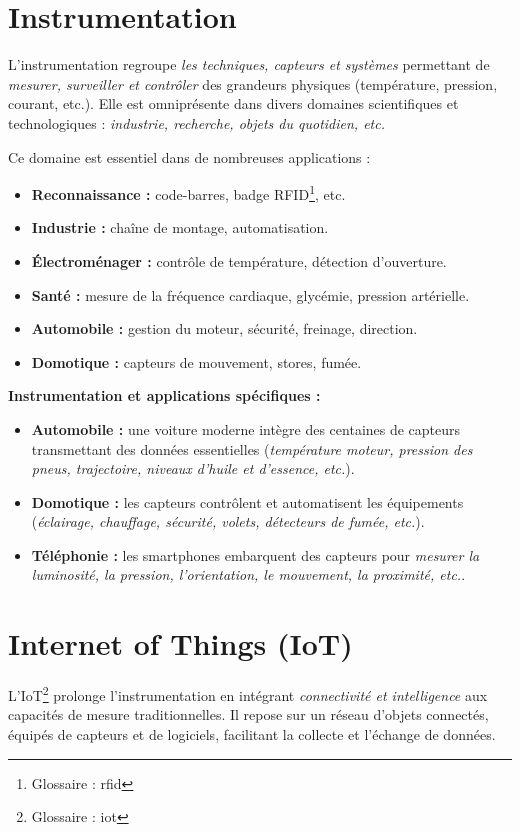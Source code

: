  \label{ch:Introduction}
\section{Instrumentation}
L'instrumentation regroupe \emph{les techniques, capteurs et systèmes} permettant de \emph{mesurer, surveiller et contrôler} des grandeurs physiques (température, pression, courant, etc.). Elle est omniprésente dans divers domaines scientifiques et technologiques : \emph{industrie, recherche, objets du quotidien, etc.}  

Ce domaine est essentiel dans de nombreuses applications :  
\begin{itemize}
  \item \textbf{Reconnaissance :} code-barres, badge RFID\footnote{Glossaire : \gls{rfid}}, etc.  
  \item \textbf{Industrie :} chaîne de montage, automatisation.  
  \item \textbf{Électroménager :} contrôle de température, détection d'ouverture.  
  \item \textbf{Santé :} mesure de la fréquence cardiaque, glycémie, pression artérielle.  
  \item \textbf{Automobile :} gestion du moteur, sécurité, freinage, direction.  
  \item \textbf{Domotique :} capteurs de mouvement, stores, fumée.  
\end{itemize}

\textbf{Instrumentation et applications spécifiques :}  
\begin{itemize}
  \item \textbf{Automobile :} une voiture moderne intègre des centaines de capteurs transmettant des données essentielles (\emph{température moteur, pression des pneus, trajectoire, niveaux d'huile et d'essence, etc.}).  
  \item \textbf{Domotique :} les capteurs contrôlent et automatisent les équipements (\emph{éclairage, chauffage, sécurité, volets, détecteurs de fumée, etc.}).  
  \item \textbf{Téléphonie :} les smartphones embarquent des capteurs pour \emph{mesurer la luminosité, la pression, l'orientation, le mouvement, la proximité, etc.}.  
\end{itemize}

\section{Internet of Things (IoT)}
L'IoT\footnote{Glossaire : \gls{iot}} prolonge l'instrumentation en intégrant \emph{connectivité et intelligence} aux capacités de mesure traditionnelles. Il repose sur un réseau d'objets connectés, équipés de capteurs et de logiciels, facilitant la collecte et l'échange de données.  

